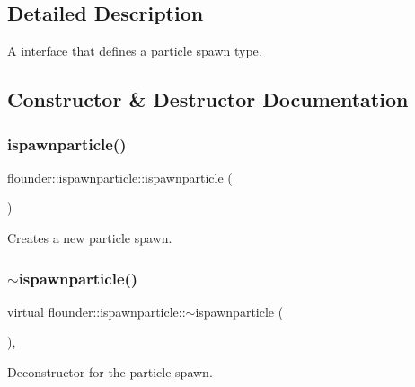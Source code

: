 \subsection{Detailed Description}
A interface that defines a particle spawn type. 



\subsection{Constructor \& Destructor Documentation}
\mbox{\label{classflounder_1_1ispawnparticle_a1e2da8a80d66a3d5c5e4c17cbddd897f}} 
\subsubsection{\texorpdfstring{ispawnparticle()}{ispawnparticle()}}
{\footnotesize\ttfamily flounder\+::ispawnparticle\+::ispawnparticle (\begin{DoxyParamCaption}{ }\end{DoxyParamCaption})\hspace{0.3cm}{\ttfamily [inline]}}



Creates a new particle spawn. 

\mbox{\label{classflounder_1_1ispawnparticle_ae003a3a839fe693d42a84035a7cf4c52}} 
\subsubsection{\texorpdfstring{$\sim$ispawnparticle()}{~ispawnparticle()}}
{\footnotesize\ttfamily virtual flounder\+::ispawnparticle\+::$\sim$ispawnparticle (\begin{DoxyParamCaption}{ }\end{DoxyParamCaption})\hspace{0.3cm}{\ttfamily [inline]}, {\ttfamily [virtual]}}



Deconstructor for the particle spawn. 



